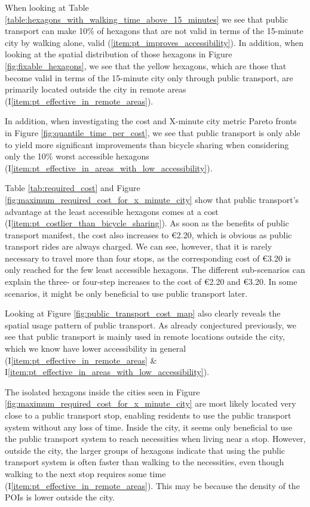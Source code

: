 When looking at Table \ref{table:hexagons_with_walking_time_above_15_minutes} we see that public transport can make 10\% of hexagons that are not valid in terms of the 15-minute city by walking alone, valid (\ref{item:pt_improves_accessibility}).
In addition, when looking at the spatial distribution of those hexagons in Figure \ref{fig:fixable_hexagons}, we see that the yellow hexagons, which are those that become valid in terms of the 15-minute city only through public transport, are primarily located outside the city in remote areas (I\ref{item:pt_effective_in_remote_areas}).

In addition, when investigating the cost and X-minute city metric Pareto fronts in Figure \ref{fig:quantile_time_per_cost}, we see that public transport is only able to yield more significant improvements than bicycle sharing when considering only the 10\% worst accessible hexagons (I\ref{item:pt_effective_in_areas_with_low_accessibility}).

Table \ref{tab:required_cost} and Figure \ref{fig:maximum_required_cost_for_x_minute_city} show that public transport's advantage at the least accessible hexagons comes at a cost (I\ref{item:pt_costlier_than_bicycle_sharing}).
As soon as the benefits of public transport manifest, the cost also increases to \euro{2.20}, which is obvious as public transport rides are always charged.
We can see, however, that it is rarely necessary to travel more than four stops, as the corresponding cost of \euro{3.20} is only reached for the few least accessible hexagons.
The different sub-scenarios can explain the three- or four-step increases to the cost of \euro{2.20} and \euro{3.20}.
In some scenarios, it might be only beneficial to use public transport later.

Looking at Figure \ref{fig:public_transport_cost_map} also clearly reveals the spatial usage pattern of public transport.
As already conjectured previously, we see that public transport is mainly used in remote locations outside the city, which we know have lower accessibility in general (I\ref{item:pt_effective_in_remote_areas} \& I\ref{item:pt_effective_in_areas_with_low_accessibility}).

The isolated hexagons inside the cities seen in Figure \ref{fig:maximum_required_cost_for_x_minute_city} are most likely located very close to a public transport stop, enabling residents to use the public transport system without any loss of time.
Inside the city, it seems only beneficial to use the public transport system to reach necessities when living near a stop.
However, outside the city, the larger groups of hexagons indicate that using the public transport system is often faster than walking to the necessities, even though walking to the next stop requires some time (I\ref{item:pt_effective_in_remote_areas}).
This may be because the density of the POIs is lower outside the city.

